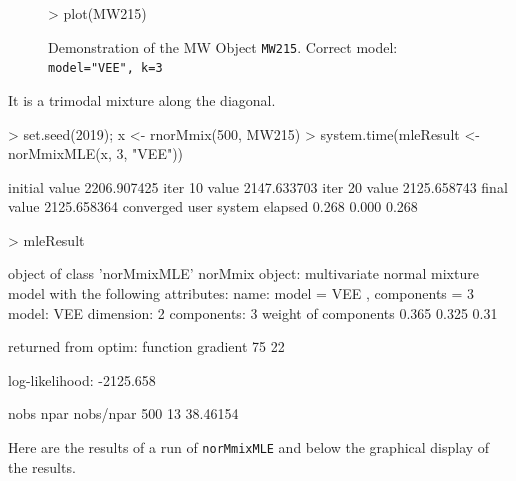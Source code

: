 \begin{figure}
    \begin{Rgraph}[0.9]
\begin{Schunk}
\begin{Sinput}
>     plot(MW215)
\end{Sinput}
\end{Schunk}
    \caption{Demonstration of the MW Object {\tt MW215}. Correct model: 
             {\tt model="VEE", k=3}}
    \label{fig:demoMW}
    \end{Rgraph}
\end{figure}

It is a trimodal mixture along the diagonal.

\begin{Schunk}
\begin{Sinput}
>     set.seed(2019); x <- rnorMmix(500, MW215)
>     system.time(mleResult <- norMmixMLE(x, 3, "VEE"))
\end{Sinput}
\begin{Soutput}
initial  value 2206.907425 
iter  10 value 2147.633703
iter  20 value 2125.658743
final  value 2125.658364 
converged
   user  system elapsed 
  0.268   0.000   0.268 
\end{Soutput}
\begin{Sinput}
>     mleResult
\end{Sinput}
\begin{Soutput}
object of class 'norMmixMLE' 
norMmix object: 
multivariate normal mixture model with the following attributes:
name: 		 model = VEE , components = 3 
 model: 		 VEE 
 dimension:	 2 
 components:	 3 
weight of components 0.365 0.325 0.31 

returned from optim:
function gradient 
      75       22 

log-likelihood: -2125.658 
 
 nobs	npar	nobs/npar
 500 	 13 	 38.46154 
\end{Soutput}
\end{Schunk}

Here are the results of a run of {\tt norMmixMLE} and below the graphical 
display of the results.



